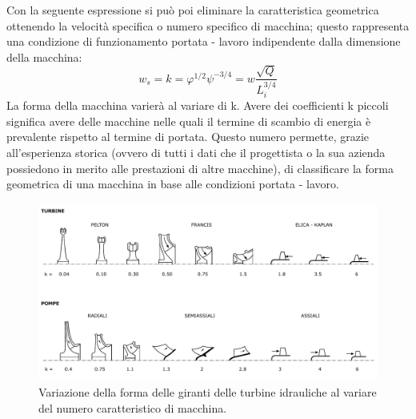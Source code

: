 Con la seguente espressione si può poi eliminare la caratteristica geometrica ottenendo la velocità specifica o numero specifico di macchina; questo rappresenta una condizione di funzionamento portata - lavoro indipendente dalla dimensione della macchina:
\begin{equation}
w_s = k = \varphi^{1/2} \psi^{-3/4} = w \frac{\sqrt{Q}}{L_i^{3/4}}
\end{equation}
La forma della macchina varierà al variare di k. Avere dei coefficienti k piccoli significa avere delle macchine nelle quali il termine di scambio di energia è prevalente rispetto al termine di portata. Questo numero permette, grazie all'esperienza storica (ovvero di tutti i dati che il progettista o la sua azienda possiedono in merito alle prestazioni di altre macchine), di classificare la forma geometrica di una macchina in base alle condizioni portata - lavoro.
\begin{figure}[h!]
\centering
  \includegraphics[width=\textwidth]{fig/numcar.pdf}
\caption{Variazione della forma delle giranti delle turbine idrauliche al variare del numero caratteristico di macchina.}
\label{fig:numcar}
\end{figure}

